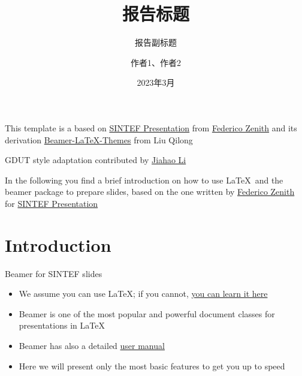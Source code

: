 \documentclass{beamer}
\title{报告标题}
\subtitle{报告副标题}
\author{作者1、作者2}
\date{2023年3月}
\newcommand{\hrefcol}[2]{\textcolor{cyan}{\href{#1}{#2}}}
\begin{document}
\maketitle

\begin{frame}
	
This template is a based on \hrefcol{https://www.overleaf.com/latex/templates/sintef-presentation/jhbhdffczpnx}{SINTEF Presentation} from \hrefcol{mailto:federico.zenith@sintef.no}{Federico Zenith} and its derivation \hrefcol{https://github.com/TOB-KNPOB/Beamer-LaTeX-Themes}{Beamer-LaTeX-Themes} from Liu Qilong

\vspace{\baselineskip}

GDUT style adaptation contributed by \hrefcol{https://jiahaoli57.github.io}{Jiahao Li}

\vspace{\baselineskip}

In the following you find a brief introduction on how to use \LaTeX\ and the beamer package to prepare slides, based on the one written by \hrefcol{mailto:federico.zenith@sintef.no}{Federico Zenith} for \hrefcol{https://www.overleaf.com/latex/templates/sintef-presentation/jhbhdffczpnx}{SINTEF Presentation}


\end{frame}


\section{Introduction}

\begin{frame}{Beamer for SINTEF slides}
	\begin{itemize}
		\item We assume you can use \LaTeX; if you cannot,
		\hrefcol{http://en.wikibooks.org/wiki/LaTeX/}{you can learn it here}
		\item Beamer is one of the most popular and powerful document
		classes for presentations in \LaTeX
		\item Beamer has also a detailed
		\hrefcol{http://www.ctan.org/tex-archive/macros/latex/contrib/beamer/doc/beameruserguide.pdf}{user
			manual}
		\item Here we will present only the most basic features to get you up to speed
	\end{itemize}
\end{frame}
\end{document}
